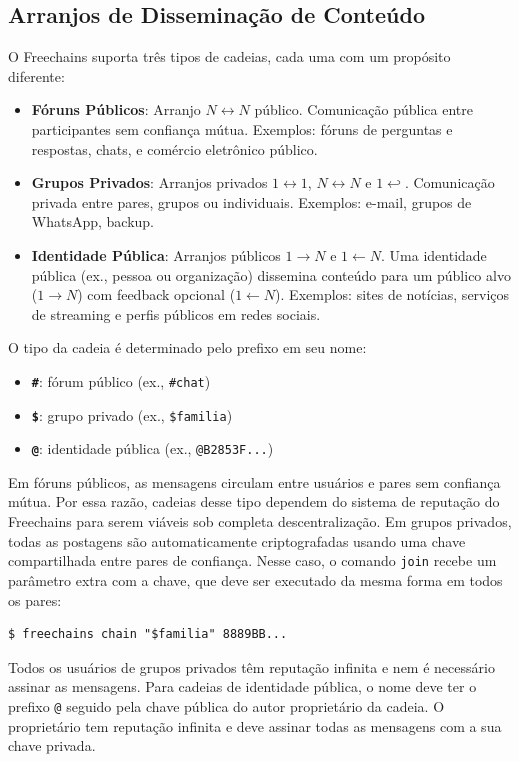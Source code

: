 \documentclass[12pt]{article}
\newcommand{\FC} {Freechains\xspace}
\newcommand{\Xon} {$1{\rightarrow}N$\xspace}
\newcommand{\Xno} {$1{\leftarrow}N$\xspace}
\newcommand{\Xnn} {$N{\leftrightarrow}N$\xspace}
\newcommand{\Xoo} {$1{\leftrightarrow}1$\xspace}
\newcommand{\Xo}  {$1{\hookleftarrow}$\xspace}
\begin{document}
\subsection{Arranjos de Disseminação de Conteúdo}

O \FC suporta três tipos de cadeias, cada uma com um propósito diferente:
%
\begin{itemize}
\item \textbf{Fóruns Públicos}:
    Arranjo \Xnn público.
    Comunicação pública entre participantes sem confiança mútua.
    Exemplos: fóruns de perguntas e respostas, chats, e comércio eletrônico
              público.
\item \textbf{Grupos Privados}:
    Arranjos privados \Xoo, \Xnn e \Xo.
    Comunicação privada entre pares, grupos ou individuais.
    Exemplos: e-mail, grupos de WhatsApp, backup.
\item \textbf{Identidade Pública}:
    Arranjos públicos \Xon e \Xno.
    Uma identidade pública (ex., pessoa ou organização) dissemina conteúdo para
    um público alvo (\Xon) com feedback opcional (\Xno).
    Exemplos: sites de notícias, serviços de streaming e perfis públicos em
    redes sociais.
\end{itemize}
%
O tipo da cadeia é determinado pelo prefixo em seu nome:
%
\begin{itemize}
    \item \textbf{\texttt{\#}}: fórum público (ex., \texttt{\#chat})
    \item \textbf{\texttt{\$}}: grupo privado (ex., \texttt{\$familia})
    \item \textbf{\texttt{@}}: identidade pública (ex., \texttt{@B2853F...})
\end{itemize}

Em fóruns públicos, as mensagens circulam entre usuários e pares sem confiança
mútua.
Por essa razão, cadeias desse tipo dependem do sistema de reputação do \FC para
serem viáveis sob completa descentralização.
%
Em grupos privados, todas as postagens são automaticamente criptografadas
usando uma chave compartilhada entre pares de confiança.
Nesse caso, o comando \texttt{join} recebe um parâmetro extra com a chave, que
deve ser executado da mesma forma em todos os pares:
%
{\footnotesize
\begin{verbatim}
$ freechains chain "$familia" 8889BB...
\end{verbatim}
}
%
Todos os usuários de grupos privados têm reputação infinita e nem é necessário
assinar as mensagens.
%
Para cadeias de identidade pública, o nome deve ter o prefixo \texttt{@}
seguido pela chave pública do autor proprietário da cadeia.
O proprietário tem reputação infinita e deve assinar todas as mensagens com a
sua chave privada.
\end{document}
